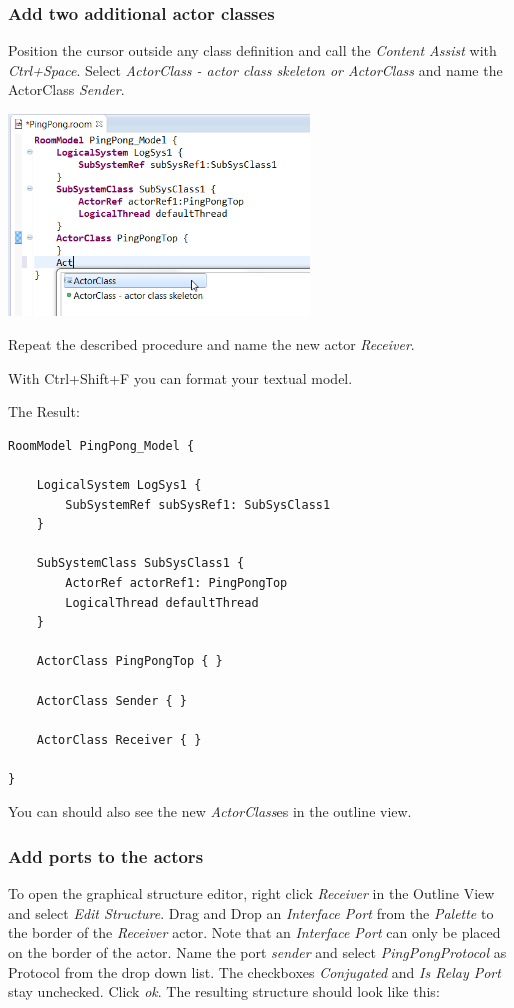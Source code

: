 \subsubsection{Add two additional actor classes}

Position the cursor outside any class definition and call the \textit{Content Assist} with \emph{Ctrl+Space}.
Select \textit{ActorClass - actor class skeleton or ActorClass} and name the ActorClass \textit{Sender}.

\includegraphics[width=0.6\textwidth]{images/017-02-content-assist.png}

Repeat the described procedure and name the new actor \textit{Receiver}.

With Ctrl+Shift+F you can format your textual model. 

The Result:

\begin{lstlisting}[language=ROOM]
RoomModel PingPong_Model {

	LogicalSystem LogSys1 {
		SubSystemRef subSysRef1: SubSysClass1
	}

	SubSystemClass SubSysClass1 {
		ActorRef actorRef1: PingPongTop
		LogicalThread defaultThread
	}

	ActorClass PingPongTop { }

	ActorClass Sender { }

	ActorClass Receiver { }

}
\end{lstlisting}

You can should also see the new \emph{ActorClass}es in the outline view.

\subsubsection{Add ports to the actors}

To open the graphical structure editor, right click \textit{Receiver} in the Outline View and select \textit{Edit Structure}. Drag and Drop an 
\textit{Interface Port} from the \emph{Palette} to the border of the \textit{Receiver} actor. Note that an \emph{Interface Port} can only be placed on the border of the actor. Name the port \textit{sender} and select \textit{PingPongProtocol} as Protocol from the drop down list. The checkboxes \textit{Conjugated} and \textit{Is Relay Port} stay unchecked. Click \textit{ok}. The 
resulting structure should look like this:

